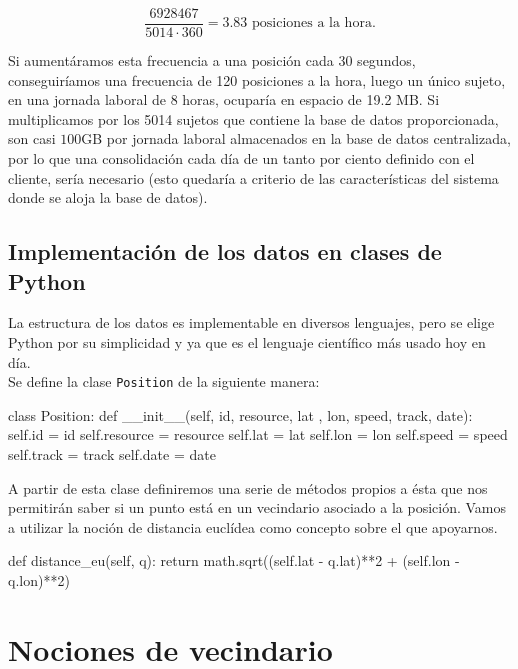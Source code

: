 \documentclass[a4paper, 12pt, spanish]{article}
\begin{document}
$$ \frac{6928467}{5014 \cdot 360} = 3.83 \text{ posiciones a la hora.}$$ 

Si aument\'aramos esta frecuencia a una posici\'on cada 30 segundos, conseguir\'iamos una frecuencia de 120 posiciones a la hora, luego un \'unico sujeto, en una jornada laboral de 8 horas, ocupar\'ia en espacio de 19.2 MB. Si multiplicamos por los 5014 sujetos que contiene la base de datos proporcionada, son casi $100$GB por jornada laboral almacenados en la base de datos centralizada, por lo que una consolidaci\'on cada d\'ia de un tanto por ciento definido con el cliente, ser\'ia necesario (esto quedar\'ia a criterio de las caracter\'isticas del sistema donde se aloja la base de datos).

\subsection{Implementaci\'on de los datos en clases de Python}\label{sec:positionClass}

La estructura de los datos es implementable en diversos lenguajes, pero se elige Python por su simplicidad y ya que es el lenguaje cient\'ifico m\'as usado hoy en d\'ia.\\

Se define la clase \texttt{Position} de la siguiente manera:\\

\begin{python}
class Position:
    def __init__(self, id, resource, lat
    		    , lon, speed, track, date):
        self.id = id
        self.resource = resource
        self.lat = lat
        self.lon = lon
        self.speed = speed
        self.track = track
        self.date = date
\end{python}

\bigskip

A partir de esta clase definiremos una serie de m\'etodos propios a \'esta que nos permitir\'an saber si un punto est\'a en un vecindario asociado a la posici\'on. Vamos a utilizar la noci\'on de distancia eucl\'idea como concepto sobre el que apoyarnos.\\

\begin{python}
        def distance_eu(self, q):
                return math.sqrt((self.lat - q.lat)**2 
                	+ (self.lon - q.lon)**2)
\end{python}


\pagebreak
\section{Nociones de vecindario}
\end{document}
